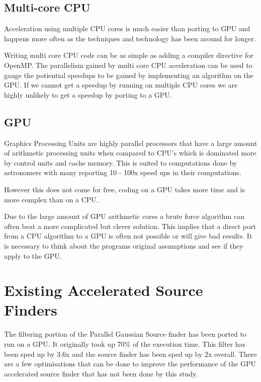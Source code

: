 \documentclass[prodmode,acmtecs]{acmsmall} \usepackage[ruled]{algorithm2e}
\begin{document}
    \subsection{Multi-core CPU}
    Acceleration using multiple CPU cores is much easier than porting to GPU and happens more often as the techniques
    and technology has been around for longer. {\cite{fluke2011astrophysical}
    Writing multi core CPU code can be as simple as adding a compiler directive for OpenMP.
    The parallelism gained by multi core CPU acceleration can be used to gauge the potiential speedups
    to be gained by implementing an algorithm on the GPU. If we cannot get a speedup by running
    on multiple CPU cores we are highly unlikely to get a speedup by porting to a GPU. 
    
        \cite{westerlund2014framework}
        \cite{scott}

    \subsection{GPU}
Graphics Processing Units are highly parallel processors that have a large amount of
arithmetic processing units when compared to CPU's which is dominated more by control units
and cache memory. This is suited to computations done by astronomers with many reporting 
10 - 100x speed ups in their computations. \cite{hassan2011unleashing}

However this does not come for free, coding on a GPU takes more time and is more complex than on a CPU. 

Due to the large amount of GPU arithmetic cores a brute force algorithm can often beat
a more complicated but clever solution.  \cite{fluke2011astrophysical} This implies that a direct port from
a CPU algorithm to a GPU is often not possible or will give bad results. It is necessary to think about the programs original
assumptions and see if they apply to the GPU. 

    \cite{laidler2013detection}

\section{Existing Accelerated Source Finders}
The filtering portion of the Parallel Gaussian Source finder \cite{westerlund2015performance}
has been ported to run on a GPU. It originally took up 70\% of the execution time.
This filter has been sped up by 3.6x and the source finder has been sped up by 2x overall. 
There are a few optimisations that can be done to improve the performance of the GPU accelerated
source finder that has not been done by this study. 

}
\end{document}
